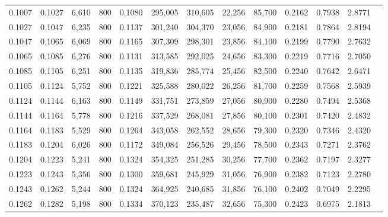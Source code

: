 \begin{tabular}{rrrrrrrrrrrrr}
0.1007 & 0.1027 &  6,610 &   800 &                                     0.1080 & 295,005 & 310,605 &  22,256 &  85,700 & 0.2162 & 0.7938 & 2.8771 \\
0.1027 & 0.1047 &  6,235 &   800 &                                     0.1137 & 301,240 & 304,370 &  23,056 &  84,900 & 0.2181 & 0.7864 & 2.8194 \\
0.1047 & 0.1065 &  6,069 &   800 &                                     0.1165 & 307,309 & 298,301 &  23,856 &  84,100 & 0.2199 & 0.7790 & 2.7632 \\
0.1065 & 0.1085 &  6,276 &   800 &                                     0.1131 & 313,585 & 292,025 &  24,656 &  83,300 & 0.2219 & 0.7716 & 2.7050 \\
0.1085 & 0.1105 &  6,251 &   800 &                                     0.1135 & 319,836 & 285,774 &  25,456 &  82,500 & 0.2240 & 0.7642 & 2.6471 \\
0.1105 & 0.1124 &  5,752 &   800 &                                     0.1221 & 325,588 & 280,022 &  26,256 &  81,700 & 0.2259 & 0.7568 & 2.5939 \\
0.1124 & 0.1144 &  6,163 &   800 &                                     0.1149 & 331,751 & 273,859 &  27,056 &  80,900 & 0.2280 & 0.7494 & 2.5368 \\
0.1144 & 0.1164 &  5,778 &   800 &                                     0.1216 & 337,529 & 268,081 &  27,856 &  80,100 & 0.2301 & 0.7420 & 2.4832 \\
0.1164 & 0.1183 &  5,529 &   800 &                                     0.1264 & 343,058 & 262,552 &  28,656 &  79,300 & 0.2320 & 0.7346 & 2.4320 \\
0.1183 & 0.1204 &  6,026 &   800 &                                     0.1172 & 349,084 & 256,526 &  29,456 &  78,500 & 0.2343 & 0.7271 & 2.3762 \\
0.1204 & 0.1223 &  5,241 &   800 &                                     0.1324 & 354,325 & 251,285 &  30,256 &  77,700 & 0.2362 & 0.7197 & 2.3277 \\
0.1223 & 0.1243 &  5,356 &   800 &                                     0.1300 & 359,681 & 245,929 &  31,056 &  76,900 & 0.2382 & 0.7123 & 2.2780 \\
0.1243 & 0.1262 &  5,244 &   800 &                                     0.1324 & 364,925 & 240,685 &  31,856 &  76,100 & 0.2402 & 0.7049 & 2.2295 \\
0.1262 & 0.1282 &  5,198 &   800 &                                     0.1334 & 370,123 & 235,487 &  32,656 &  75,300 & 0.2423 & 0.6975 & 2.1813 \\

\end{tabular}
